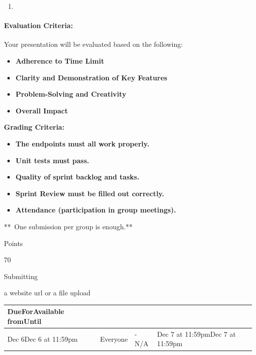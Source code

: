 \documentclass[
]{article}
\providecommand{\tightlist}{%
  \setlength{\itemsep}{0pt}\setlength{\parskip}{0pt}}
\begin{document}
\begin{enumerate}
\def\labelenumi{\arabic{enumi}.}
\tightlist
\item
\end{enumerate}

\paragraph{\texorpdfstring{\textbf{Evaluation
Criteria:}}{Evaluation Criteria:}}\label{evaluation-criteria}

Your presentation will be evaluated based on the following:

\begin{itemize}
\tightlist
\item
  \textbf{Adherence to Time Limit}
\item
  \textbf{Clarity and Demonstration of Key Features}
\item
  \textbf{Problem-Solving and Creativity}
\item
  \textbf{Overall Impact}
\end{itemize}

\textbf{Grading Criteria:}

\begin{itemize}
\tightlist
\item
  \textbf{The endpoints must all work properly.}
\item
  \textbf{Unit tests must pass.}
\item
  \textbf{Quality of sprint backlog and tasks.}
\item
  \textbf{Sprint Review must be filled out correctly.}
\item
  \textbf{Attendance (participation in group meetings).}
\end{itemize}

**~One submission per group is enough.**

Points

70

Submitting

a website url or a file upload

\begin{longtable}[]{@{}llll@{}}
\toprule\noalign{}
DueForAvailable fromUntil & & & \\
\midrule\noalign{}
\endhead
\bottomrule\noalign{}
\endlastfoot
Dec 6Dec 6 at 11:59pm & Everyone & -N/A & Dec 7 at 11:59pmDec 7 at
11:59pm \\
\end{longtable}
\end{document}
